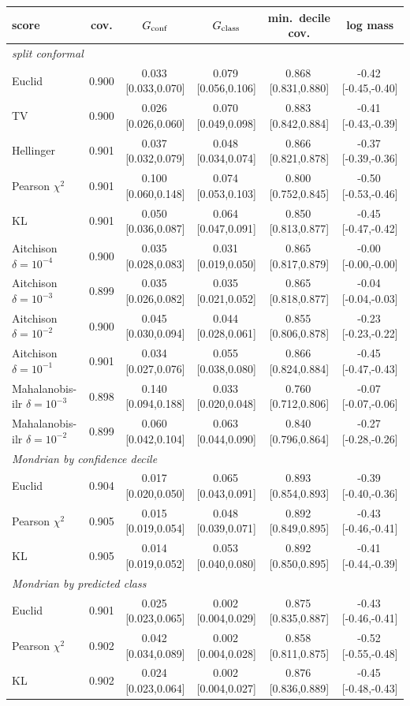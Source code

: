 \begin{tabular}{lccccc}\toprule
score & cov. & $G_{\rm conf}$ & $G_{\rm class}$ & min.\ decile cov. & log mass\\\midrule
\multicolumn{6}{l}{\emph{split conformal}}\\
Euclid & 0.900 & 0.033\,[0.033,0.070] & 0.079\,[0.056,0.106] & 0.868\,[0.831,0.880] & -0.42\,[-0.45,-0.40]\\
TV & 0.900 & 0.026\,[0.026,0.060] & 0.070\,[0.049,0.098] & 0.883\,[0.842,0.884] & -0.41\,[-0.43,-0.39]\\
Hellinger & 0.901 & 0.037\,[0.032,0.079] & 0.048\,[0.034,0.074] & 0.866\,[0.821,0.878] & -0.37\,[-0.39,-0.36]\\
Pearson $\chi^2$ & 0.901 & 0.100\,[0.060,0.148] & 0.074\,[0.053,0.103] & 0.800\,[0.752,0.845] & -0.50\,[-0.53,-0.46]\\
KL & 0.901 & 0.050\,[0.036,0.087] & 0.064\,[0.047,0.091] & 0.850\,[0.813,0.877] & -0.45\,[-0.47,-0.42]\\
Aitchison $\delta{=}10^{-4}$ & 0.900 & 0.035\,[0.028,0.083] & 0.031\,[0.019,0.050] & 0.865\,[0.817,0.879] & -0.00\,[-0.00,-0.00]\\
Aitchison $\delta{=}10^{-3}$ & 0.899 & 0.035\,[0.026,0.082] & 0.035\,[0.021,0.052] & 0.865\,[0.818,0.877] & -0.04\,[-0.04,-0.03]\\
Aitchison $\delta{=}10^{-2}$ & 0.900 & 0.045\,[0.030,0.094] & 0.044\,[0.028,0.061] & 0.855\,[0.806,0.878] & -0.23\,[-0.23,-0.22]\\
Aitchison $\delta{=}10^{-1}$ & 0.901 & 0.034\,[0.027,0.076] & 0.055\,[0.038,0.080] & 0.866\,[0.824,0.884] & -0.45\,[-0.47,-0.43]\\
Mahalanobis-ilr $\delta{=}10^{-3}$ & 0.898 & 0.140\,[0.094,0.188] & 0.033\,[0.020,0.048] & 0.760\,[0.712,0.806] & -0.07\,[-0.07,-0.06]\\
Mahalanobis-ilr $\delta{=}10^{-2}$ & 0.899 & 0.060\,[0.042,0.104] & 0.063\,[0.044,0.090] & 0.840\,[0.796,0.864] & -0.27\,[-0.28,-0.26]\\
\multicolumn{6}{l}{\emph{Mondrian by confidence decile}}\\
Euclid & 0.904 & 0.017\,[0.020,0.050] & 0.065\,[0.043,0.091] & 0.893\,[0.854,0.893] & -0.39\,[-0.40,-0.36]\\
Pearson $\chi^2$ & 0.905 & 0.015\,[0.019,0.054] & 0.048\,[0.039,0.071] & 0.892\,[0.849,0.895] & -0.43\,[-0.46,-0.41]\\
KL & 0.905 & 0.014\,[0.019,0.052] & 0.053\,[0.040,0.080] & 0.892\,[0.850,0.895] & -0.41\,[-0.44,-0.39]\\
\multicolumn{6}{l}{\emph{Mondrian by predicted class}}\\
Euclid & 0.901 & 0.025\,[0.023,0.065] & 0.002\,[0.004,0.029] & 0.875\,[0.835,0.887] & -0.43\,[-0.46,-0.41]\\
Pearson $\chi^2$ & 0.902 & 0.042\,[0.034,0.089] & 0.002\,[0.004,0.028] & 0.858\,[0.811,0.875] & -0.52\,[-0.55,-0.48]\\
KL & 0.902 & 0.024\,[0.023,0.064] & 0.002\,[0.004,0.027] & 0.876\,[0.836,0.889] & -0.45\,[-0.48,-0.43]\\
\bottomrule\end{tabular}

